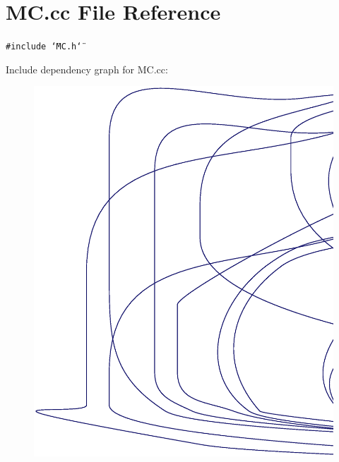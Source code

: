 \section{MC.cc File Reference}
\label{MC_8cc}
{\tt \#include \char`\"{}MC.h\char`\"{}}\par


Include dependency graph for MC.cc:\nopagebreak
\begin{figure}[H]
\begin{center}
\leavevmode
\includegraphics[width=420pt]{MC_8cc__incl}
\end{center}
\end{figure}
